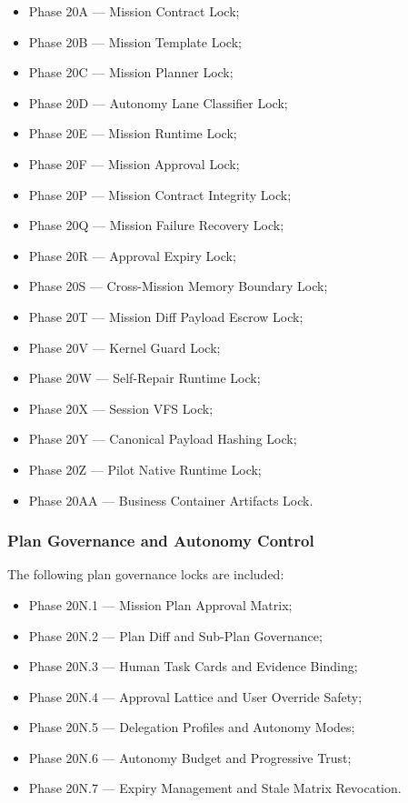 \begin{itemize}
  \item Phase 20A --- Mission Contract Lock;
  \item Phase 20B --- Mission Template Lock;
  \item Phase 20C --- Mission Planner Lock;
  \item Phase 20D --- Autonomy Lane Classifier Lock;
  \item Phase 20E --- Mission Runtime Lock;
  \item Phase 20F --- Mission Approval Lock;
  \item Phase 20P --- Mission Contract Integrity Lock;
  \item Phase 20Q --- Mission Failure Recovery Lock;
  \item Phase 20R --- Approval Expiry Lock;
  \item Phase 20S --- Cross-Mission Memory Boundary Lock;
  \item Phase 20T --- Mission Diff Payload Escrow Lock;
  \item Phase 20V --- Kernel Guard Lock;
  \item Phase 20W --- Self-Repair Runtime Lock;
  \item Phase 20X --- Session VFS Lock;
  \item Phase 20Y --- Canonical Payload Hashing Lock;
  \item Phase 20Z --- Pilot Native Runtime Lock;
  \item Phase 20AA --- Business Container Artifacts Lock.
\end{itemize}

\subsubsection{Plan Governance and Autonomy Control}

The following plan governance locks are included:

\begin{itemize}
  \item Phase 20N.1 --- Mission Plan Approval Matrix;
  \item Phase 20N.2 --- Plan Diff and Sub-Plan Governance;
  \item Phase 20N.3 --- Human Task Cards and Evidence Binding;
  \item Phase 20N.4 --- Approval Lattice and User Override Safety;
  \item Phase 20N.5 --- Delegation Profiles and Autonomy Modes;
  \item Phase 20N.6 --- Autonomy Budget and Progressive Trust;
  \item Phase 20N.7 --- Expiry Management and Stale Matrix Revocation.
\end{itemize}

